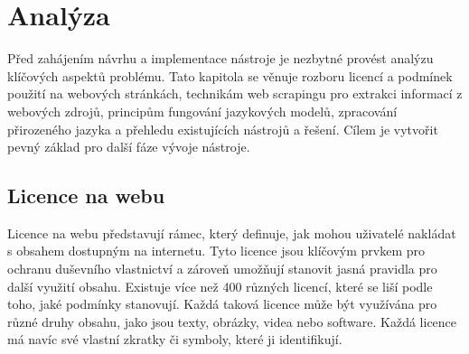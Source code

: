 \chapter{Analýza}

\begin{chapterabstract}
    Před zahájením návrhu a implementace nástroje je nezbytné provést analýzu klíčových aspektů problému.
    Tato kapitola se věnuje rozboru licencí a podmínek použití na webových stránkách, technikám web scrapingu pro extrakci informací z webových zdrojů, principům fungování jazykových modelů, zpracování přirozeného jazyka a přehledu existujících nástrojů a řešení.
    Cílem je vytvořit pevný základ pro další fáze vývoje nástroje.
\end{chapterabstract}

\section{Licence na webu}
Licence na webu představují rámec, který definuje, jak mohou uživatelé nakládat s obsahem dostupným na internetu.
Tyto licence jsou klíčovým prvkem pro ochranu duševního vlastnictví a zároveň umožňují stanovit jasná pravidla pro další využití obsahu.
Existuje více než 400 různých licencí, které se liší podle toho, jaké podmínky stanovují. Každá taková licence může být využívána pro různé druhy obsahu, jako jsou texty, obrázky, videa nebo software.
Každá licence má navíc své vlastní zkratky či symboly, které ji identifikují. \cite{spdxSPDXLicense}

